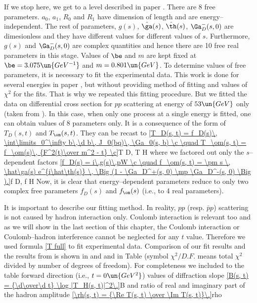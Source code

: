 If we stop here, we get to a level described in paper . There are 8 free parameters. $a_0$, $a_1$, $R_0$ and $R_1$ have dimension of length and are energy--independent. The rest of parameters, $g(s)$, $\hat\ga(s)$, $\hat\th(s)$, $\Ga^-_D(s, 0)$ are dimesionless and they have different values for different values of $s$. Furthermore, $g(s)$ and $\Ga^-_D(s, 0)$ are complex quantities and hence there are 10 free real parameters in this stage. Values of $\be$ and $m$ are kept fixed at $\be = 3.075\un{GeV^{-1}}$ and $m = 0.801\un{GeV}$. To determine values of free parameters, it is necessary to fit the experimental data. This work is done for several energies in paper , but without providing method of fitting and values of $\chi^2$ for the fits. That is why we repeated this fitting procedure. But we fitted the data on differential cross section for $pp$ scattering at energy of $53\un{GeV}$ only (taken from ). In this case, when only one process at a single energy is fitted, one can obtain values of 8 parameters only. It is a consequence of the form of $T_D(s, t)$ and $T_\om(s, t)$. They can be recast to
\eqref{T_D(s, t) = f_D(s)\, \int\limits_0^\infty b\,\d b\, J_0(bq)\, \Ga_0(s, b) \c  \quad T_\om(s, t) = f_\om(s)\, {F^2(t)\over m^2 - t} \c}{T D, T H}
where we factored out only the $s$--dependent factors
\eqref{f_D(s) = i\,g(s)\,pW \c \quad f_\om(s, t) = \pm s \, \hat\ga(s) e^{i\hat\th(s)} \, \Big (1 - \Ga_D^+(s, 0) \mp \Ga_D^-(s, 0) \Big ).}{f D, f H}
Now, it is clear that energy--dependent parameters reduce to only two complex free parameters $f_D(s)$ and $f_\om(s)$ (i.e., to 4 real parameters). 

It is important to describe our fitting method. In reality, $pp$ (resp. $\bar pp$) scattering is not caused by hadron interaction only. Coulomb interaction is relevant too and as we will show in the last section of this chapter, the Coulomb interaction or Coulomb--hadron interference cannot be neglected for any $t$ value. Therefore we used formula \ref{T full} to fit experimental data. Comparison of our fit results and the results from  is shown in \fgs{}  and  and in Table  (symbol $\chi^2/D.F.$ means total $\chi^2$ divided by number of degrees of freedom). For completeness we included to the table forward direction (i.e., $t = 0\un{GeV^2}$) values of diffraction slope  
\eqref{B(s, t) = {\d\over\d t} \log |T_H(s, t)|^2\.}{B}
and ratio of real and imaginary part of the hadron amplitude
\eqref{\rh(s, t) = {\Re T(s, t) \over \Im T(s, t)}\.}{rho}

